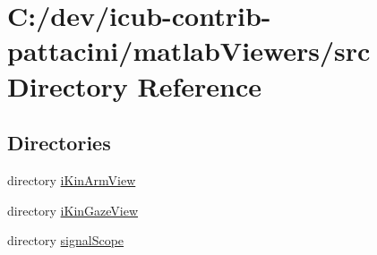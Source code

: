 \section{C\+:/dev/icub-\/contrib-\/pattacini/matlab\+Viewers/src Directory Reference}
\label{dir_acab2c3e53afd6c8b3208e4a35ae300f}
\subsection*{Directories}
\begin{DoxyCompactItemize}
\item 
directory \hyperlink{dir_f3d399cecb55a0170abc3f36868029e4}{i\+Kin\+Arm\+View}
\item 
directory \hyperlink{dir_3fa9b72c143bc0ff4567170a4424dd74}{i\+Kin\+Gaze\+View}
\item 
directory \hyperlink{dir_985ff0338e34c6a4cb84290f3920672f}{signal\+Scope}
\end{DoxyCompactItemize}
